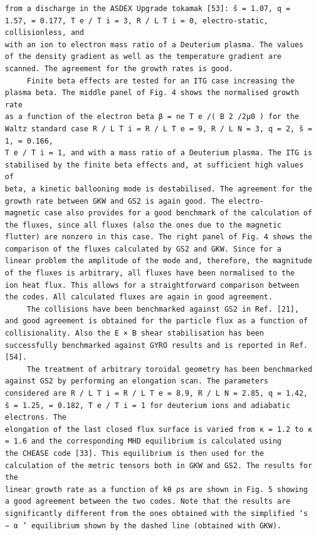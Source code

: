 \documentclass[a4paper]{article}
\newcommand{\gkwpagefont}{\fontsize{6.0pt}{7.55pt}\selectfont}
\begin{document}
\begin{Verbatim}[fontsize=\gkwpagefont]
from a discharge in the ASDEX Upgrade tokamak [53]: ŝ = 1.07, q = 1.57, = 0.177, T e / T i = 3, R / L T i = 0, electro-static, collisionless, and
with an ion to electron mass ratio of a Deuterium plasma. The values of the density gradient as well as the temperature gradient are
scanned. The agreement for the growth rates is good.
     Finite beta effects are tested for an ITG case increasing the plasma beta. The middle panel of Fig. 4 shows the normalised growth rate
as a function of the electron beta β = ne T e /( B 2 /2μ0 ) for the Waltz standard case R / L T i = R / L T e = 9, R / L N = 3, q = 2, ŝ = 1, = 0.166,
T e / T i = 1, and with a mass ratio of a Deuterium plasma. The ITG is stabilised by the finite beta effects and, at sufficient high values of
beta, a kinetic ballooning mode is destabilised. The agreement for the growth rate between GKW and GS2 is again good. The electro-
magnetic case also provides for a good benchmark of the calculation of the fluxes, since all fluxes (also the ones due to the magnetic
flutter) are nonzero in this case. The right panel of Fig. 4 shows the comparison of the fluxes calculated by GS2 and GKW. Since for a
linear problem the amplitude of the mode and, therefore, the magnitude of the fluxes is arbitrary, all fluxes have been normalised to the
ion heat flux. This allows for a straightforward comparison between the codes. All calculated fluxes are again in good agreement.
     The collisions have been benchmarked against GS2 in Ref. [21], and good agreement is obtained for the particle flux as a function of
collisionality. Also the E × B shear stabilisation has been successfully benchmarked against GYRO results and is reported in Ref. [54].
     The treatment of arbitrary toroidal geometry has been benchmarked against GS2 by performing an elongation scan. The parameters
considered are R / L T i = R / L T e = 8.9, R / L N = 2.85, q = 1.42, ŝ = 1.25, = 0.182, T e / T i = 1 for deuterium ions and adiabatic electrons. The
elongation of the last closed flux surface is varied from κ = 1.2 to κ = 1.6 and the corresponding MHD equilibrium is calculated using
the CHEASE code [33]. This equilibrium is then used for the calculation of the metric tensors both in GKW and GS2. The results for the
linear growth rate as a function of kθ ρs are shown in Fig. 5 showing a good agreement between the two codes. Note that the results are
significantly different from the ones obtained with the simplified ‘s − α ’ equilibrium shown by the dashed line (obtained with GKW).
\end{Verbatim}
\newpage
\end{document}
